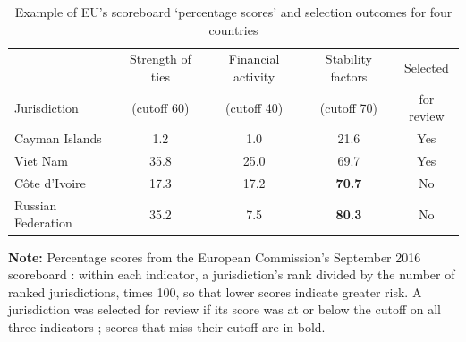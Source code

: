\begin{table}[ht!]
\centering
\caption{Example of EU's scoreboard `percentage scores' and selection outcomes for four countries\label{t:example}}
\begin{tabular}{lcccc}
\toprule
 & Strength of ties & Financial activity & Stability factors & Selected \\
Jurisdiction & (cutoff 60) & (cutoff 40) & (cutoff 70) & for review \\
\midrule
Cayman Islands &  1.2 &  1.0 & 21.6 & Yes \\
Viet Nam & 35.8 & 25.0 & 69.7 & Yes \\
C\^{o}te d'Ivoire & 17.3 & 17.2 & \textbf{70.7} & No \\
Russian Federation & 35.2 &  7.5 & \textbf{80.3} & No \\
\bottomrule
\end{tabular}
\begin{flushleft}\footnotesize
{\bf Note:} Percentage scores from the European Commission's September 2016 scoreboard \cite{europeancommission2016scoreboard}: within each indicator, a jurisdiction's rank divided by the number of ranked jurisdictions, times 100, so that lower scores indicate greater risk. A jurisdiction was selected for review if its score was at or below the cutoff on all three indicators \cite{europeancommission2017methodology}; scores that miss their cutoff are in bold.
\end{flushleft}
\end{table}
